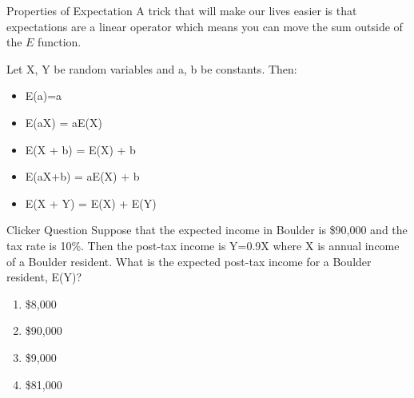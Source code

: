 \documentclass{beamer}
\begin{document}






\begin{frame}{Properties of Expectation}
	A trick that will make our lives easier is that expectations are a \alert{linear operator} which means you can move the sum outside of the $E$ function. 
	
	Let X, Y be random variables and a, b be constants. Then:
	\begin{itemize}
		\item E(a)=a
		\item E(aX) = aE(X)
		\item E(X + b) = E(X) + b
		\item E(aX+b) = aE(X) + b
		\item E(X + Y) = E(X) + E(Y)
	\end{itemize}
\end{frame}

\begin{frame}{Clicker Question}
	Suppose that the expected income in Boulder is \$90,000 and the tax rate is 10\%. Then the post-tax income is Y=0.9X where X is annual income of a Boulder resident. What is the expected post-tax income for a Boulder resident, E(Y)?
	
	\begin{enumerate}[label=(\alph*)]
		\item \$8,000
		\item \$90,000
		\item \$9,000
		\item \$81,000
	\end{enumerate}
\end{frame}

\end{document}
